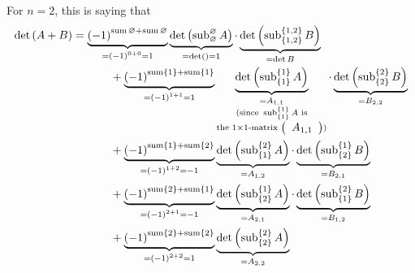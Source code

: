 \begin{example}
For $n=2$, this is saying that%
\begin{align*}
\det\left(  A+B\right)   &  =\underbrace{\left(  -1\right)
^{\operatorname*{sum}\varnothing+\operatorname*{sum}\varnothing}}_{=\left(
-1\right)  ^{0+0}=1}\underbrace{\det\left(  \operatorname*{sub}%
\nolimits_{\varnothing}^{\varnothing}A\right)  }_{=\det\left(  {}\right)
=1}\cdot\underbrace{\det\left(  \operatorname*{sub}\nolimits_{\left\{
1,2\right\}  }^{\left\{  1,2\right\}  }B\right)  }_{=\det B}\\
&  \ \ \ \ \ \ \ \ \ \ +\underbrace{\left(  -1\right)  ^{\operatorname*{sum}%
\left\{  1\right\}  +\operatorname*{sum}\left\{  1\right\}  }}_{=\left(
-1\right)  ^{1+1}=1}\underbrace{\det\left(  \operatorname*{sub}%
\nolimits_{\left\{  1\right\}  }^{\left\{  1\right\}  }A\right)
}_{\substack{=A_{1,1}\\\text{(since }\operatorname*{sub}\nolimits_{\left\{
1\right\}  }^{\left\{  1\right\}  }A\text{ is}\\\text{the }1\times
1\text{-matrix }\left(
\begin{array}
[c]{c}%
A_{1,1}%
\end{array}
\right)  \text{)}}}\cdot\underbrace{\det\left(  \operatorname*{sub}%
\nolimits_{\left\{  2\right\}  }^{\left\{  2\right\}  }B\right)  }_{=B_{2,2}%
}\\
&  \ \ \ \ \ \ \ \ \ \ +\underbrace{\left(  -1\right)  ^{\operatorname*{sum}%
\left\{  1\right\}  +\operatorname*{sum}\left\{  2\right\}  }}_{=\left(
-1\right)  ^{1+2}=-1}\underbrace{\det\left(  \operatorname*{sub}%
\nolimits_{\left\{  1\right\}  }^{\left\{  2\right\}  }A\right)  }_{=A_{1,2}%
}\cdot\underbrace{\det\left(  \operatorname*{sub}\nolimits_{\left\{
2\right\}  }^{\left\{  1\right\}  }B\right)  }_{=B_{2,1}}\\
&  \ \ \ \ \ \ \ \ \ \ +\underbrace{\left(  -1\right)  ^{\operatorname*{sum}%
\left\{  2\right\}  +\operatorname*{sum}\left\{  1\right\}  }}_{=\left(
-1\right)  ^{2+1}=-1}\underbrace{\det\left(  \operatorname*{sub}%
\nolimits_{\left\{  2\right\}  }^{\left\{  1\right\}  }A\right)  }_{=A_{2,1}%
}\cdot\underbrace{\det\left(  \operatorname*{sub}\nolimits_{\left\{
1\right\}  }^{\left\{  2\right\}  }B\right)  }_{=B_{1,2}}\\
&  \ \ \ \ \ \ \ \ \ \ +\underbrace{\left(  -1\right)  ^{\operatorname*{sum}%
\left\{  2\right\}  +\operatorname*{sum}\left\{  2\right\}  }}_{=\left(
-1\right)  ^{2+2}=1}\underbrace{\det\left(  \operatorname*{sub}%
\nolimits_{\left\{  2\right\}  }^{\left\{  2\right\}  }A\right)  }_{=A_{2,2}%
}
\end{align*}
\end{example}
